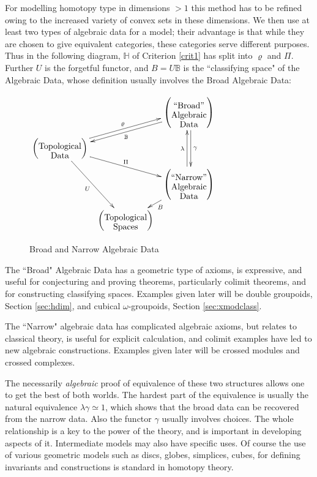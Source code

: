 \documentclass{elsarticle}
\def\rho{\varrho}
\def\B{\beta}
\def\B{\beta}
\def\H{\mathbb H}
\def\B{\mathbb B}
\begin{document}
For modelling homotopy type in dimensions $> 1$  this method has to be refined owing to the
increased variety of convex sets in these dimensions. We then use at least two types of algebraic
data for a model;  their advantage is that while they are chosen to give equivalent categories,  these categories  serve
different purposes.  Thus in the following diagram, $\H$  of Criterion \ref{crit1}  has split into $\rho$ and $\Pi$.
Further $U$  is the forgetful functor, and $B = U \B$  is the ``classifying space"  of the Algebraic Data,
whose definition usually involves the Broad Algebraic Data:

\begin{figure}[h]
\centering
 $\xymatrix @C=0.5pc@R=0.5pc{ &&\ar@<0.5ex>[dd]^{\gamma}   \left(\txt{``Broad''\\ Algebraic \\ Data}\right) \ar @<0.5ex>[dll]^{\mathbb B} \\
 \left(\txt{Topological \\ Data}\right)\ar @<0.5ex>[urr]^ \rho \ar[ddr]_U  \ar [drr]^\Pi  &&\\
  &&  \left(\txt{``Narrow'' \\Algebraic\\  Data}\right)\ar@<0.5ex>[uu]^{\lambda}  \ar [dl] ^ B \\ &\left(\txt{Topological \\ Spaces}\right)   &    }  $
 \caption{Broad and Narrow Algebraic Data} \label{fig:bddata}
\end{figure}
The ``Broad" Algebraic Data has a geometric type of axioms, is expressive,  and useful for conjecturing and
proving theorems, particularly colimit theorems, and for constructing classifying
spaces. Examples given later will be double groupoids, Section \ref{sec:hdim}, and cubical $\omega$-groupoids, Section \ref{sec:xmodclass}.

The ``Narrow" algebraic data has complicated algebraic axioms,  but relates to classical
theory, is useful for explicit calculation, and colimit examples have led to new algebraic constructions.
Examples given later will be crossed modules and crossed complexes.

The necessarily {\it algebraic}  proof of equivalence of these two structures allows one to get the best of both
worlds.  The hardest part of the equivalence is usually the natural equivalence $\lambda \gamma \simeq 1$, which shows that the broad data can be recovered from the narrow data. Also the functor $\gamma$ usually involves choices. The  whole relationship is a key to the power of the theory, and is important in developing
aspects of it. Intermediate models may also have specific uses.  Of course  the use of various geometric models such as discs, globes, simplices, cubes, for
defining invariants and constructions is standard in homotopy theory.
\end{document}
